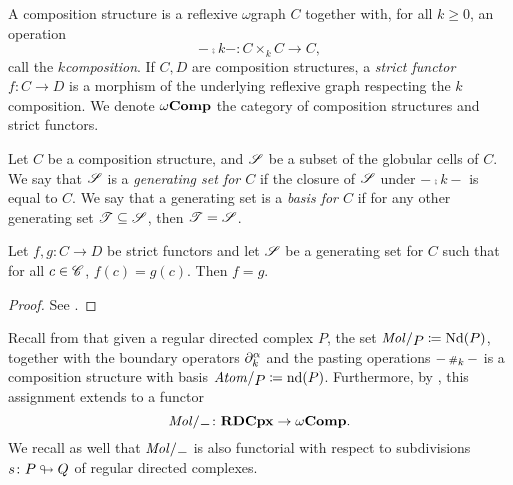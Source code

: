 \begin{dfn} 
    A composition structure is a reflexive \( \omega \)\nbd graph \( C \) together with, for all \( k \geq 0 \), an operation
    \begin{equation*}
        - \comp{k} - \colon C \times_k C \to C,
    \end{equation*}
    call the \emph{\( k \)\nbd composition}.
    If \( C, D \) are composition structures, a \emph{strict functor} \( f \colon C \to D \) is a morphism of the underlying reflexive graph respecting the \( k \)\nbd composition.
    We denote \( \omega\mathbf{Comp} \) the category of composition structures and strict functors.
\end{dfn}

\begin{dfn} 
    Let \( C \) be a composition structure, and \( \mathscr{S} \) be a subset of the globular cells of \( C \).
    We say that \( \mathscr{S} \) is a \emph{generating set for \( C \)} if the closure of \( \mathscr{S} \) under \( - \comp{k} - \) is equal to \( C \).
    We say that a generating set is a \emph{basis for \( C \)} if for any other generating set \( \mathscr{T} \subseteq \mathscr{S} \), then \( \mathscr{T} = \mathscr{S} \).
\end{dfn}

\begin{lem}\label{lem:strict_functor_determined_by_basis}
    Let \( f, g \colon C \to D \) be strict functors and let \( \mathscr{S} \) be a generating set for \( C \) such that for all \( c \in \mathscr{C} \), \( f(c) = g(c) \).
    Then \( f = g \).
\end{lem}
\begin{proof}
    See \cite[Lemma 5.1.23]{hadzihasanovic2024combinatorics}.
\end{proof}

\noindent Recall from \cite[Section 5.2]{hadzihasanovic2024combinatorics} that given a regular directed complex \( P \), the set \( \molecin{P} \eqdef \Nd(P) \), together with the boundary operators \( \partial_{k}^{\alpha} \) and the pasting operations \( - \,{\scriptstyle\#}_{k}\, - \) is a composition structure with basis \( \atomin{P} \eqdef \nd(P) \).
Furthermore, by \cite[Theorem 6.2.32]{hadzihasanovic2024combinatorics}, this assignment extends to a functor
\begin{equation*}
    \molecin{-} \colon \rdcpx \to \Comp.
\end{equation*}
We recall as well that \( \molecin{-} \) is also functorial with respect to subdivisions \( s \colon P \looparrowright Q \) of regular directed complexes.

